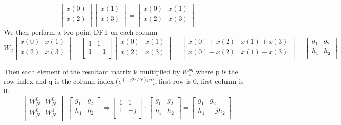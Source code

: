 \documentclass{article}
\begin{document}
\begin{center}
\[
\begin{bmatrix}
   x(0) \\
    x(2)  \\
\end{bmatrix}
\begin{bmatrix}
   x(1) \\
    x(3)  \\
\end{bmatrix}=
\begin{bmatrix}
   x(0) & x(1) \\
    x(2) & x(3) \\
\end{bmatrix}
\]
We then perform a two-point DFT on each column
\[W_2
\begin{bmatrix}
   x(0) & x(1) \\
    x(2) & x(3) \\
\end{bmatrix}=
\begin{bmatrix}
   1 & 1 \\
    1 & -1 \\
\end{bmatrix}
\begin{bmatrix}
   x(0) & x(1) \\
    x(2) & x(3) \\
\end{bmatrix}=
\begin{bmatrix}
   x(0)+x(2) & x(1)+x(3) \\
    x(0)-x(2) & x(1)-x(3) \\
\end{bmatrix}=
\begin{bmatrix}
   g_1 & g_2 \\
    h_1 & h_2 \\
\end{bmatrix}
\]
\end{center}
Then each element of the resultant matrix is multiplied by $W_4^{pq}$ where p is the row index and q is the column index ($e^{(-j2\pi/N)pq}$), first row is 0, first column is 0. 
\[
\begin{bmatrix}
   W_N^0 & W_N^0  \\
    W_N^0  & W_N^1  \\
\end{bmatrix}\cdot
\begin{bmatrix}
   g_1 & g_2 \\
    h_1 & h_2 \\
\end{bmatrix}\Rightarrow
\begin{bmatrix}
   1 & 1  \\
    1  & -j  \\
\end{bmatrix}\cdot
\begin{bmatrix}
   g_1 & g_2 \\
    h_1 & h_2 \\
\end{bmatrix}=
\begin{bmatrix}
   g_1 & g_2 \\
    h_1 & -jh_2 \\
\end{bmatrix}
\]
\end{document}

